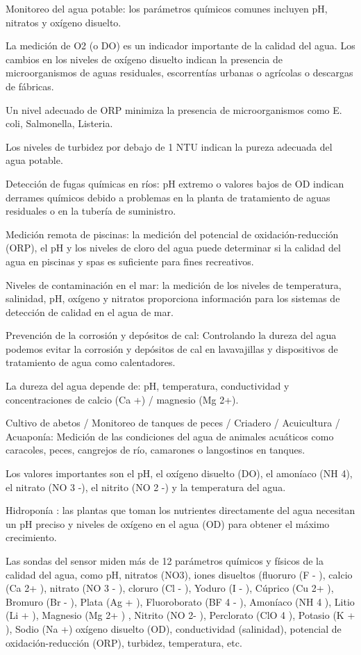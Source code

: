 Monitoreo del agua potable: los parámetros químicos comunes incluyen pH, nitratos y oxígeno disuelto. 

La medición de O2 (o DO) es un indicador importante de la calidad del agua. 
Los cambios en los niveles de oxígeno disuelto indican la presencia de microorganismos de aguas residuales, escorrentías urbanas o agrícolas o descargas de fábricas. 

Un nivel adecuado de ORP minimiza la presencia de microorganismos como  E. coli, Salmonella, Listeria. 

Los niveles de turbidez por debajo de 1 NTU indican la pureza adecuada del agua potable.

Detección de fugas químicas en ríos: pH extremo o valores bajos de OD indican derrames químicos debido a problemas en la planta de tratamiento de aguas residuales o en la tubería de suministro.

Medición remota de piscinas: la medición del potencial de oxidación-reducción (ORP), el pH y los niveles de cloro del agua puede determinar si la calidad del agua en piscinas y spas es suficiente para fines recreativos.

Niveles de contaminación en el mar: la medición de los niveles de temperatura, salinidad, pH, oxígeno y nitratos proporciona información para los sistemas de detección de calidad en el agua de mar.

Prevención de la corrosión y depósitos de cal:  Controlando la dureza del agua podemos evitar la corrosión y depósitos de cal en lavavajillas y dispositivos de tratamiento de agua como calentadores. 

La dureza del agua depende de: pH, temperatura, conductividad y concentraciones de calcio (Ca +) / magnesio (Mg 2+).

Cultivo de abetos / Monitoreo de tanques de peces / Criadero / Acuicultura / Acuaponía: Medición de las condiciones del agua de animales acuáticos como caracoles, peces, cangrejos de río, camarones o langostinos en tanques. 

Los valores importantes son el pH, el oxígeno disuelto (DO), el amoníaco (NH 4), el nitrato (NO 3 -), el nitrito (NO 2 -) y la temperatura del agua.

Hidroponía : las plantas que toman los nutrientes directamente del agua necesitan un pH preciso y niveles de oxígeno en el agua (OD) para obtener el máximo crecimiento.

Las sondas del sensor miden más de 12 parámetros químicos y físicos de la calidad del agua, como pH, nitratos (NO3), iones disueltos (fluoruro (F - ), calcio (Ca 2+ ), nitrato (NO 3 - ), cloruro (Cl - ), Yoduro (I - ), Cúprico (Cu 2+ ), Bromuro (Br - ), Plata (Ag + ), Fluoroborato (BF 4 - ), Amoníaco (NH 4 ), Litio (Li + ), Magnesio (Mg 2+ ) , Nitrito (NO 2- ), Perclorato (ClO 4 ), Potasio (K + ), Sodio (Na +) oxígeno disuelto (OD), conductividad (salinidad), potencial de oxidación-reducción (ORP), turbidez, temperatura, etc.

